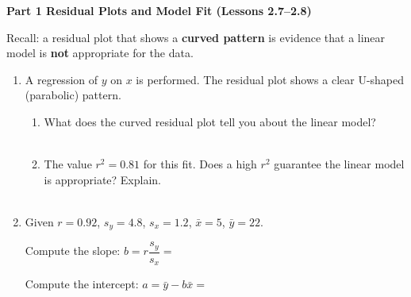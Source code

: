 \documentclass[10pt]{article}
\begin{document}
\namedateperiod

\vspace{0.3in}

{\large\bfseries\color{navy} Part 1 \quad Residual Plots and Model Fit (Lessons 2.7--2.8)}

\vspace{0.12in}
\noindent Recall: a residual plot that shows a \textbf{curved pattern} is evidence that a
linear model is \textbf{not} appropriate for the data.

\vspace{0.1in}

\begin{enumerate}[leftmargin=1.6em, itemsep=0.22in]

  \item A regression of $y$ on $x$ is performed. The residual plot shows a clear U-shaped
        (parabolic) pattern.

        \begin{enumerate}[label=\textbf{(\alph*)}, leftmargin=1.6em, itemsep=8pt]
          \item What does the curved residual plot tell you about the linear model?\\[8pt]
                \writeline\\[1pt]\writeline

          \item The value $r^2 = 0.81$ for this fit. Does a high $r^2$ guarantee the linear
                model is appropriate? Explain.\\[8pt]
                \writeline\\[1pt]\writeline
        \end{enumerate}

  \item Given $r = 0.92$, $s_y = 4.8$, $s_x = 1.2$, $\bar{x} = 5$, $\bar{y} = 22$.

        \vspace{4pt}
        Compute the slope: $b = r\dfrac{s_y}{s_x} = $ \blank{4cm}

        \vspace{6pt}
        Compute the intercept: $a = \bar{y} - b\bar{x} = $ \blank{4cm}

\end{enumerate}

\vspace{0.28in}
\end{document}
